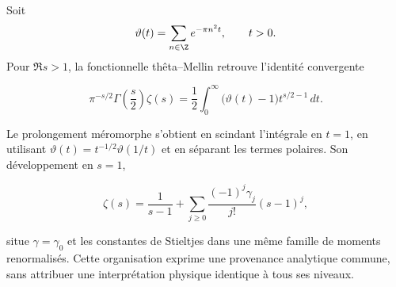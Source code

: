 Soit
\[
\vartheta(t)=\sum_{n\in\Z}e^{-\pi n^2t},\qquad t>0.
\]
Pour \(\Re s>1\), la fonctionnelle thêta--Mellin retrouve l'identité convergente

\[
\pi^{-s/2}\Gamma\!\left(\frac{s}{2}\right)\zeta(s)
=\frac12\int_0^\infty
\bigl(\vartheta(t)-1\bigr)t^{s/2-1}\,dt.
\]

Le prolongement méromorphe s'obtient en scindant l'intégrale en \(t=1\), en utilisant
\(\vartheta(t)=t^{-1/2}\vartheta(1/t)\) et en séparant les termes polaires. Son développement en \(s=1\),

\begin{equation}
\zeta(s)=\frac1{s-1}+\sum_{j\ge0}
\frac{(-1)^j\gamma_j}{j!}(s-1)^j,
\label{eq:stieltjes}
\end{equation}

situe \(\gamma=\gamma_0\) et les constantes de Stieltjes dans une même
famille de moments renormalisés. Cette organisation exprime une
provenance analytique commune, sans attribuer une interprétation physique
identique à tous ses niveaux.

